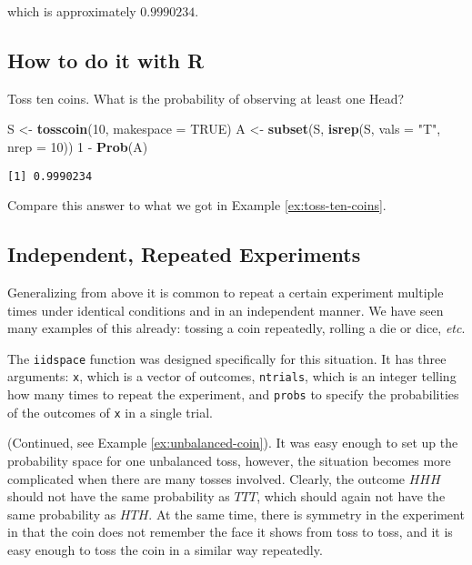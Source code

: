 \documentclass[]{book}
\newenvironment{Shaded}{\begin{snugshade}}{\end{snugshade}}
\newcommand{\KeywordTok}[1]{\textcolor[rgb]{0.13,0.29,0.53}{\textbf{{#1}}}}
\newcommand{\DataTypeTok}[1]{\textcolor[rgb]{0.13,0.29,0.53}{{#1}}}
\newcommand{\DecValTok}[1]{\textcolor[rgb]{0.00,0.00,0.81}{{#1}}}
\newcommand{\StringTok}[1]{\textcolor[rgb]{0.31,0.60,0.02}{{#1}}}
\newcommand{\OtherTok}[1]{\textcolor[rgb]{0.56,0.35,0.01}{{#1}}}
\newcommand{\NormalTok}[1]{{#1}}
\numberwithin{equation}{chapter}
\numberwithin{figure}{chapter}
\theoremstyle{plain}
\theoremstyle{definition}
\theoremstyle{remark}
\theoremstyle{definition}
\theoremstyle{definition}
\theoremstyle{remark}
\let\BeginKnitrBlock\begin \let\EndKnitrBlock\end
\begin{document}
which is approximately \(0.9990234\).

\subsection{How to do it with R}\label{how-to-do-it-with-r-17}

\BeginKnitrBlock{example}
\protect\hypertarget{ex:unnamed-chunk-173}{}{\label{ex:unnamed-chunk-173}}Toss
ten coins. What is the probability of observing at least one Head?
\EndKnitrBlock{example}

\begin{Shaded}
\begin{Highlighting}[]
\NormalTok{S <-}\StringTok{ }\KeywordTok{tosscoin}\NormalTok{(}\DecValTok{10}\NormalTok{, }\DataTypeTok{makespace =} \OtherTok{TRUE}\NormalTok{)}
\NormalTok{A <-}\StringTok{ }\KeywordTok{subset}\NormalTok{(S, }\KeywordTok{isrep}\NormalTok{(S, }\DataTypeTok{vals =} \StringTok{"T"}\NormalTok{, }\DataTypeTok{nrep =} \DecValTok{10}\NormalTok{))}
\DecValTok{1} \NormalTok{-}\StringTok{ }\KeywordTok{Prob}\NormalTok{(A)}
\end{Highlighting}
\end{Shaded}

\begin{verbatim}
[1] 0.9990234
\end{verbatim}

Compare this answer to what we got in Example \ref{ex:toss-ten-coins}.

\subsection{Independent, Repeated
Experiments}\label{independent-repeated-experiments}

Generalizing from above it is common to repeat a certain experiment
multiple times under identical conditions and in an independent manner.
We have seen many examples of this already: tossing a coin repeatedly,
rolling a die or dice, \emph{etc}.

The \texttt{iidspace} function was designed specifically for this
situation. It has three arguments: \texttt{x}, which is a vector of
outcomes, \texttt{ntrials}, which is an integer telling how many times
to repeat the experiment, and \texttt{probs} to specify the
probabilities of the outcomes of \texttt{x} in a single trial.

\bigskip

\BeginKnitrBlock{example}[An unbalanced coin]
\protect\hypertarget{ex:unnamed-chunk-175}{}{\label{ex:unnamed-chunk-175}
\iffalse (An unbalanced coin) \fi }(Continued, see Example
\ref{ex:unbalanced-coin}). It was easy enough to set up the probability
space for one unbalanced toss, however, the situation becomes more
complicated when there are many tosses involved. Clearly, the outcome
\(HHH\) should not have the same probability as \(TTT\), which should
again not have the same probability as \(HTH\). At the same time, there
is symmetry in the experiment in that the coin does not remember the
face it shows from toss to toss, and it is easy enough to toss the coin
in a similar way repeatedly.
\EndKnitrBlock{example}
\end{document}
